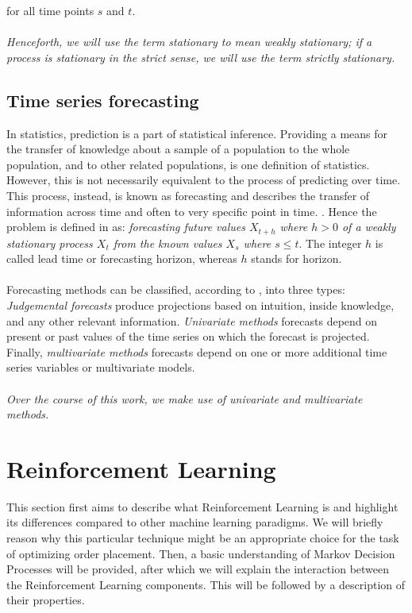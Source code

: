 for all time points $s$ and $t$.
\\
\\
\textit{Henceforth, we will use the term stationary to mean weakly stationary; if a process is stationary in the strict sense, we will use the term strictly stationary.}

\subsection{Time series forecasting}

In statistics, prediction is a part of statistical inference. 
Providing a means for the transfer of knowledge about a sample of a population to the whole population, and to other related populations, is one definition of statistics. 
However, this is not necessarily equivalent to the process of predicting over time. 
This process, instead, is known as forecasting and describes the transfer of information across time and often to very specific point in time. \cite{wiki-timeseries}.
Hence the problem is defined in \cite{ito1993encyclopedic} as: \textit{forecasting future values $X_{t+h}$ where $h > 0$ of a weakly stationary process ${X_t}$ from the known values $X_s$ where $s \leq t$}. 
The integer $h$ is called lead time or forecasting horizon, whereas $h$ stands for horizon.
\\
\\
Forecasting methods can be classified, according to \cite{chatfield2000time}, into three types: \textit{Judgemental forecasts} produce projections based on intuition, inside knowledge, and any other relevant information.
\textit{Univariate methods} forecasts depend on present or past values of the time series on which the forecast is projected.
Finally, \textit{multivariate methods} forecasts depend on one or more additional time series variables or multivariate models.
\\
\\
\textit{Over the course of this work, we make use of univariate and multivariate methods.}

\section{Reinforcement Learning}
\label{sec:reinforcement-learning}

This section first aims to describe what Reinforcement Learning is and highlight its differences compared to other machine learning paradigms. 
We will briefly reason why this particular technique might be an appropriate choice for the task of optimizing order placement. 
Then, a basic understanding of Markov Decision Processes will be provided, after which we will explain the interaction between the Reinforcement Learning components. This will be followed by a description of their properties.

